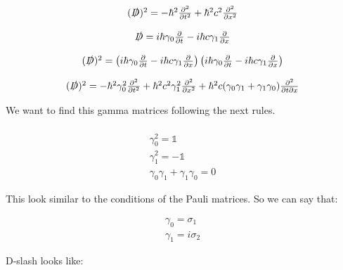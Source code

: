 \begin{equation}
  \begin{array}{c}
    (\slashed{D})^2 = -\hbar^2 \frac{\partial^2}{\partial t^2} + \hbar^2 c^2 \frac{\partial^2}{\partial x^2}
    \\

    \\
    \slashed{D} = i\hbar\gamma_0 \frac{\partial}{\partial t}-i\hbar c \gamma_1 \frac{\partial}{\partial x}
    \\

    \\
    (\slashed{D})^2 = \left(i\hbar\gamma_0\frac{\partial}{\partial t}-i\hbar c\gamma_1\frac{\partial}{\partial x}\right)\left(i\hbar\gamma_0\frac{\partial}{\partial t}-i\hbar c\gamma_1\frac{\partial}{\partial x}\right)
    \\

    \\
    (\slashed{D})^2 = -\hbar^2 \gamma_0^2 \frac{\partial^2}{\partial t^2} + \hbar^2 c^2 \gamma_1^2 \frac{\partial^2}{\partial x^2} + \hbar^2 c (\gamma_0\gamma_1 + \gamma_1\gamma_0)\frac{\partial^2}{\partial t \partial x}
  \end{array}
\end{equation}

We want to find this  gamma matrices following the next rules.

\begin{equation}
  \begin{array}{c}
    \\
    \gamma_0^2 = \mathbb{1}
    \\
    \gamma_1^2 = -\mathbb{1}
    \\
    \gamma_0\gamma_1 + \gamma_1\gamma_0 = 0
  \end{array}
\end{equation}

This look similar to the conditions of the Pauli matrices. So we can say that:

\begin{equation}
  \begin{array}{c}
    \gamma_0 = \sigma_1
    \\
    \gamma_1 = i\sigma_2
  \end{array}
\end{equation}

D-slash looks like:

